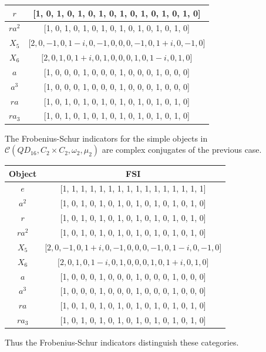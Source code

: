 \documentclass[a4paper, 10pt]{book}
\theoremstyle{definition}
\numberwithin{equation}{chapter}
\newcommand\lstl{\lstinline}
\newcommand\C{\mathcal C}
\begin{document}
\begin{enumerate}
\begin{center}
\begin{tabular}{|c|c|}
$r$    & {[}1, 0, 1, 0, 1, 0, 1, 0, 1, 0, 1, 0, 1, 0, 1, 0{]}             \\ \hline
$ra^2$ & {[}1, 0, 1, 0, 1, 0, 1, 0, 1, 0, 1, 0, 1, 0, 1, 0{]}             \\ \hline
$X_5$  & ${[}2, 0, -1, 0, 1 - i, 0, -1, 0, 0, 0, -1, 0, 1 + i, 0, -1, 0{]}$ \\ \hline
$X_6$  & ${[}2, 0, 1, 0, 1 + i, 0, 1, 0, 0, 0, 1, 0, 1 - i, 0, 1, 0{]}$     \\ \hline
$a$    & {[}1, 0, 0, 0, 1, 0, 0, 0, 1, 0, 0, 0, 1, 0, 0, 0{]}             \\ \hline
$a^3$  & {[}1, 0, 0, 0, 1, 0, 0, 0, 1, 0, 0, 0, 1, 0, 0, 0{]}             \\ \hline
$ra$   & {[}1, 0, 1, 0, 1, 0, 1, 0, 1, 0, 1, 0, 1, 0, 1, 0{]}             \\ \hline
$ra_3$ & {[}1, 0, 1, 0, 1, 0, 1, 0, 1, 0, 1, 0, 1, 0, 1, 0{]}             \\ \hline
\end{tabular}
\end{center}
 The Frobenius-Schur indicators for the simple objects in $\C(QD_{16}, C_2\times C_2, \omega_2, \mu_2)$ are complex conjugates of the previous case.
\begin{center}
\begin{tabular}{|c|c|}
\hline
Object & FSI                                                              \\ \hline
$e$    & {[}1, 1, 1, 1, 1, 1, 1, 1, 1, 1, 1, 1, 1, 1, 1, 1{]}             \\ \hline
$a^2$  & {[}1, 0, 1, 0, 1, 0, 1, 0, 1, 0, 1, 0, 1, 0, 1, 0{]}             \\ \hline
$r$    & {[}1, 0, 1, 0, 1, 0, 1, 0, 1, 0, 1, 0, 1, 0, 1, 0{]}             \\ \hline
$ra^2$ & {[}1, 0, 1, 0, 1, 0, 1, 0, 1, 0, 1, 0, 1, 0, 1, 0{]}             \\ \hline
$X_5$  & ${[}2, 0, -1, 0, 1 + i, 0, -1, 0, 0, 0, -1, 0, 1 - i, 0, -1, 0{]}$ \\ \hline
$X_6$  & ${[}2, 0, 1, 0, 1 - i, 0, 1, 0, 0, 0, 1, 0, 1 + i, 0, 1, 0{]}$     \\ \hline
$a$    & {[}1, 0, 0, 0, 1, 0, 0, 0, 1, 0, 0, 0, 1, 0, 0, 0{]}             \\ \hline
$a^3$  & {[}1, 0, 0, 0, 1, 0, 0, 0, 1, 0, 0, 0, 1, 0, 0, 0{]}             \\ \hline
$ra$   & {[}1, 0, 1, 0, 1, 0, 1, 0, 1, 0, 1, 0, 1, 0, 1, 0{]}             \\ \hline
$ra_3$ & {[}1, 0, 1, 0, 1, 0, 1, 0, 1, 0, 1, 0, 1, 0, 1, 0{]}             \\ \hline
\end{tabular}
\end{center}
Thus the Frobenius-Schur indicators distinguish these categories.
 \end{enumerate} 
\end{document}
